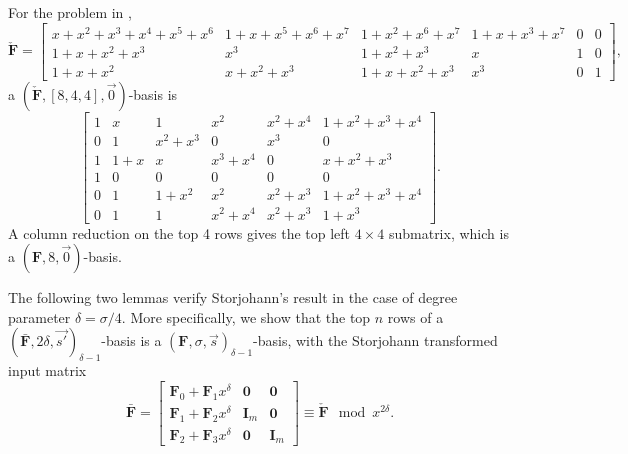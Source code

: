 \begin{exmp}
\label{exm:auxiliaryTransformation}For the problem in ,
\[
\check{\mathbf{F}}=\left[{\begin{array}{llllrr}
x+x^{2}+x^{3}+x^{4}+x^{5}+x^{6} & 1+x+x^{5}+x^{6}+x^{7} & 1+x^{2}+x^{6}+x^{7} & 1+x+x^{3}+x^{7} & 0 & 0\\
1+x+x^{2}+x^{3} & x^{3} & 1+x^{2}+x^{3} & x & 1 & 0\\
1+x+x^{2} & x+x^{2}+x^{3} & 1+x+x^{2}+x^{3} & x^{3} & 0 & 1\end{array}}\right],\]
 a $\left(\check{\mathbf{F}},\left[8,4,4\right],\vec{0}\right)$-basis
is \[
\left[\begin{array}{rccc|cc}
1 & x & 1 & x^{2} & x^{2}+x^{4} & 1+x^{2}+x^{3}+x^{4}\\
0 & 1 & x^{2}+x^{3} & 0 & x^{3} & 0\\
1 & 1+x & x & x^{3}+x^{4} & 0 & x+x^{2}+x^{3}\\
1 & 0 & 0 & 0 & 0 & 0\\
\hline 0 & 1 & 1+x^{2} & x^{2} & x^{2}+x^{3} & 1+x^{2}+x^{3}+x^{4}\\
0 & 1 & 1 & x^{2}+x^{4} & x^{2}+x^{3} & 1+x^{3}\end{array}\right].\]
 A column reduction on the top 4 rows gives the top left $4\times4$
submatrix, which is a \textbf{$(\mathbf{F},8,\vec{0})$}-basis. 
\end{exmp}
The following two lemmas verify Storjohann's result in the case of
degree parameter $\delta=\sigma/4$. More specifically, we show that
the top $n$ rows of a $(\bar{\mathbf{F}},2\delta,\vec{s'})_{\delta-1}$-basis
is a $\left(\mathbf{F},\sigma,\vec{s}\right)_{\delta-1}$-basis, with
the Storjohann transformed input matrix \begin{equation}
\bar{\mathbf{F}}=\left[\begin{array}{l|cr}
\mathbf{F}_{0}+\mathbf{F}_{1}x^{\delta} & \mathbf{0} & \mathbf{0}\\
\hline \mathbf{F}_{1}+\mathbf{F}_{2}x^{\delta} & \mathbf{I}_{m} & \mathbf{0}\\
\mathbf{F}_{2}+\mathbf{F}_{3}x^{\delta} & \mathbf{0} & \mathbf{I}_{m}\end{array}\right]\equiv\check{\mathbf{F}}\mod x^{2\delta}.\label{eq:storjohannTransformation4parts}\end{equation}

